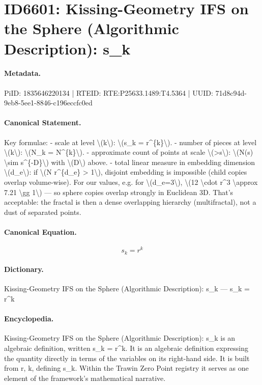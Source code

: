 \section*{ID6601: Kissing-Geometry IFS on the Sphere (Algorithmic Description): s\_k}
\paragraph{Metadata.}
PiID: 1835646220134 | RTEID: RTE:P25633.1489:T4.5364 | UUID: 71d8c94d-9eb8-5ee1-8846-c196eccfc0ed

\paragraph{Canonical Statement.}
Key formulae: - scale at level \textbackslash{}(k\textbackslash{}): \textbackslash{}(s\_k = r\textasciicircum{}\{k\}\textbackslash{}). - number of pieces at level \textbackslash{}(k\textbackslash{}): \textbackslash{}(N\_k = N\textasciicircum{}\{k\}\textbackslash{}). - approximate count of points at scale \textbackslash{}(>s\textbackslash{}): \textbackslash{}(N(s) \textbackslash{}sim s\textasciicircum{}\{-D\}\textbackslash{}) with \textbackslash{}(D\textbackslash{}) above. - total linear measure in embedding dimension \textbackslash{}(d\_e\textbackslash{}): if \textbackslash{}(N r\textasciicircum{}\{d\_e\} > 1\textbackslash{}), disjoint embedding is impossible (child copies overlap volume-wise). For our values, e.g. for \textbackslash{}(d\_e=3\textbackslash{}), \textbackslash{}(12 \textbackslash{}cdot r\textasciicircum{}3 \textbackslash{}approx 7.21 \textbackslash{}gg 1\textbackslash{}) — so sphere copies overlap strongly in Euclidean 3D. That’s acceptable: the fractal is then a dense overlapping hierarchy (multifractal), not a dust of separated points.

\paragraph{Canonical Equation.}
\[
s_k = r^{k}
\]

\paragraph{Dictionary.}
Kissing-Geometry IFS on the Sphere (Algorithmic Description): s\_k — s\_k = r\textasciicircum{}k

\paragraph{Encyclopedia.}
Kissing-Geometry IFS on the Sphere (Algorithmic Description): s\_k is an algebraic definition, written s\_k = r\textasciicircum{}k. It is an algebraic definition expressing the quantity directly in terms of the variables on its right-hand side. It is built from r, k, defining s\_k. Within the Trawin Zero Point registry it serves as one element of the framework's mathematical narrative.
